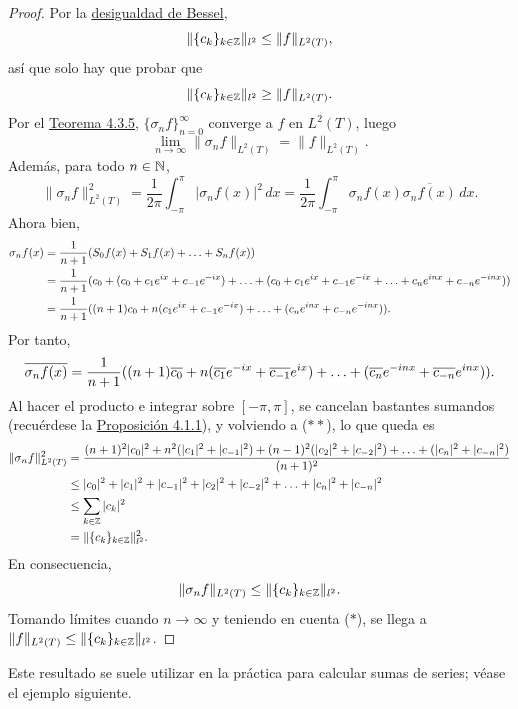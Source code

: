 \documentclass[a4paper, 11pt, oneside]{report}
\begin{document}
\begin{proof}
  Por la \hyperref[teo:4.1.7]{\color{c1}desigualdad de Bessel}, 
  \[\|\{c_k\}_{k \in \mathbb Z}\|_{l^2}\leq \|f\|_{L^2(T)},\]
  así que solo hay que probar que
  \[\|\{c_k\}_{k \in \mathbb Z}\|_{l^2}\geq \|f\|_{L^2(T)}.\]
  Por el \hyperref[teo:4.3.5]{\color{c1}Teorema 4.3.5}, $\{\sigma_nf\}_{n=0}^\infty$ converge a $f$ en $L^2(T)$, luego
  \[\lim_{n \to \infty} \|\sigma_nf\|_{L^2(T)} = \|f\|_{L^2(T)}. \tag{$\ast$}\]
  Además, para todo $n \in \mathbb N$,
  \[\|\sigma_nf\|_{L^2(T)}^2 = \frac{1}{2\pi}\int_{-\pi}^\pi |\sigma_nf(x)|^2 \, dx = \frac{1}{2\pi} \int_{-\pi}^\pi \sigma_nf(x) \overline{\sigma_nf(x)} \, dx. \tag{$\ast\ast$}\]
  Ahora bien,
  \begin{align*}\sigma_nf(x) &= \frac{1}{n+1}(S_0f(x)+S_1f(x)+\mathellipsis+S_nf(x)) \\
  &=\frac{1}{n+1}(c_0+(c_0+c_1e^{ix}+c_{-1}e^{-ix})+\mathellipsis+(c_0+c_1e^{ix}+c_{-1}e^{-ix}+\mathellipsis+c_ne^{inx}+c_{-n}e^{-inx})) \\
  &= \frac{1}{n+1}((n+1)c_0+n(c_1e^{ix}+c_{-1}e^{-ix})+\mathellipsis+(c_ne^{inx}+c_{-n}e^{-inx})).
\end{align*}
Por tanto,
\[\overline{\sigma_nf(x)} = \frac{1}{n+1}((n+1)\overline{c_0}+n(\overline{c_1}e^{-ix}+\overline{c_{-1}}e^{ix})+\mathellipsis+(\overline{c_n}e^{-inx}+\overline{c_{-n}}e^{inx})).\]
Al hacer el producto e integrar sobre $[-\pi,\pi]$, se cancelan bastantes sumandos (recuérdese la \hyperref[pro:4.1.1]{\color{c1}Proposición 4.1.1}), y volviendo a ($\ast\ast$), lo que queda es
\begin{align*}
  \|\sigma_nf\|_{L^2(T)}^2 &=\frac{(n+1)^2 |c_0|^2 + n^2(|c_1|^2+|c_{-1}|^2) + (n-1)^2(|c_2|^2+|c_{-2}|^2)+\mathellipsis+(|c_n|^2 + |c_{-n}|^2)}{(n+1)^2}  \\
  &\leq |c_0|^2+|c_1|^2+|c_{-1}|^2+|c_2|^2+|c_{-2}|^2+\mathellipsis + |c_n|^2+|c_{-n}|^2 \\
  &\leq \sum_{k \in \mathbb Z} |c_k|^2 \\
  &= \|\{c_k\}_{k \in \mathbb Z}\|_{l^2}^2.
\end{align*}
En consecuencia,
\[\|\sigma_nf\|_{L^2(T)} \leq \|\{c_k\}_{k \in \mathbb Z}\|_{l^2}.\]
Tomando límites cuando $n \to \infty$ y teniendo en cuenta ($\ast$), se llega a $\|f\|_{L^2(T)} \leq \|\{c_k\}_{k \in \mathbb Z}\|_{l^2}$.
\end{proof}

Este resultado se suele utilizar en la práctica para calcular sumas de series; véase el ejemplo siguiente.
\end{document}

